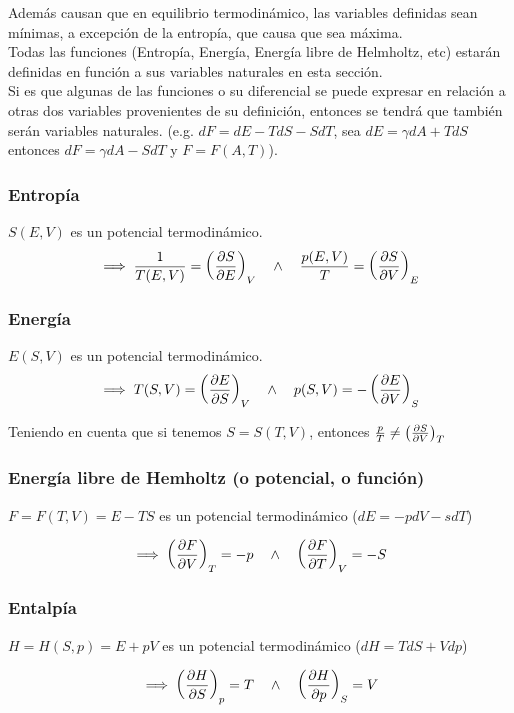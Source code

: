 Además causan que en equilibrio termodinámico, las variables definidas sean mínimas, a excepción de la entropía, que causa que sea máxima.\\

Todas las funciones (Entropía, Energía, Energía libre de Helmholtz, etc) estarán definidas en función a sus variables naturales en esta sección.\\

Si es que algunas de las funciones o su diferencial se puede expresar en relación a otras dos variables provenientes de su definición, entonces se tendrá que también serán variables naturales. (e.g. $dF = dE - TdS - SdT$, sea $dE = \gamma dA + TdS$ entonces $dF = \gamma dA - SdT$ y $F = F(A,T)$).

\subsubsection{Entropía} $S(E, V)$ es un potencial termodinámico.
\[\implies \frac{1}{T(E,V)} = \devtermo{V}{S}{E} \quad 
\land \quad \frac{p(E,V)}{T} = \devtermo{E}{S}{V}\]

\subsubsection{Energía} $E(S,V)$ es un potencial termodinámico.
\[\implies T(S,V) = \devtermo{V}{E}{S} \quad \land \quad p(S,V) = -\devtermo{S}{E}{V}\]

Teniendo en cuenta que si tenemos $S = S(T, V)$, entonces $\frac{p}{T} \neq \devtermo{T}{S}{V}$\\

\subsubsection{Energía libre de Hemholtz (o potencial, o función)} 
$F = F(T,V)=E-TS$ es un potencial termodinámico ($dE = -pdV - sdT$)

\[\implies \devtermo{T}{F}{V} = -p \quad \land \quad \devtermo{V}{F}{T} = -S\]

\subsubsection{Entalpía}
$H =H(S,p)=E+pV$ es un potencial termodinámico ($dH = TdS + Vdp$)

\[\implies \devtermo{p}{H}{S} = T \quad \land \quad \devtermo{S}{H}{p} = V\]



